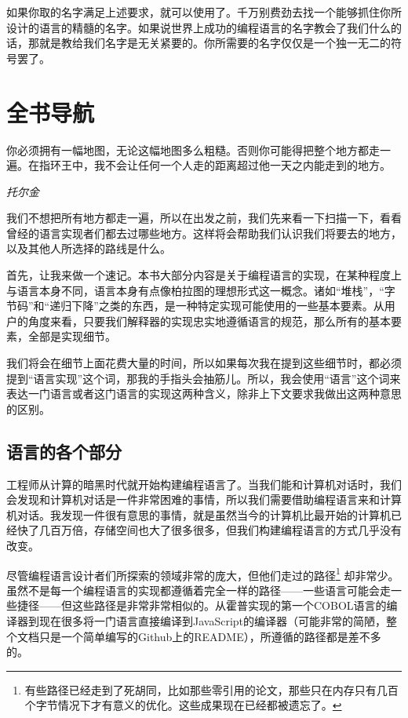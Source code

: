 \documentclass[cn,10pt,math=newtx,citestyle=gb7714-2015,bibstyle=gb7714-2015]{elegantbook}
\begin{document}
如果你取的名字满足上述要求，就可以使用了。千万别费劲去找一个能够抓住你所设计的语言的精髓的名字。如果说世界上成功的编程语言的名字教会了我们什么的话，那就是教给我们名字是无关紧要的。你所需要的名字仅仅是一个独一无二的符号罢了。

\chapter{全书导航}

\epigraph{你必须拥有一幅地图，无论这幅地图多么粗糙。否则你可能得把整个地方都走一遍。在指环王中，我不会让任何一个人走的距离超过他一天之内能走到的地方。}{\textit{托尔金}}

我们不想把所有地方都走一遍，所以在出发之前，我们先来看一下扫描一下，看看曾经的语言实现者们都去过哪些地方。这样将会帮助我们认识我们将要去的地方，以及其他人所选择的路线是什么。

首先，让我来做一个速记。本书大部分内容是关于编程语言的实现，在某种程度上与语言本身不同，语言本身有点像柏拉图的理想形式这一概念。诸如“堆栈”，“字节码”和“递归下降”之类的东西，是一种特定实现可能使用的一些基本要素。从用户的角度来看，只要我们解释器的实现忠实地遵循语言的规范，那么所有的基本要素，全部是实现细节。

我们将会在细节上面花费大量的时间，所以如果每次我在提到这些细节时，都必须提到“语言实现”这个词，那我的手指头会抽筋儿。所以，我会使用“语言”这个词来表达一门语言或者这门语言的实现这两种含义，除非上下文要求我做出这两种意思的区别。

\section{语言的各个部分}

工程师从计算的暗黑时代就开始构建编程语言了。当我们能和计算机对话时，我们会发现和计算机对话是一件非常困难的事情，所以我们需要借助编程语言来和计算机对话。我发现一件很有意思的事情，就是虽然当今的计算机比最开始的计算机已经快了几百万倍，存储空间也大了很多很多，但我们构建编程语言的方式几乎没有改变。

尽管编程语言设计者们所探索的领域非常的庞大，但他们走过的路径\footnote{有些路径已经走到了死胡同，比如那些零引用的论文，那些只在内存只有几百个字节情况下才有意义的优化。这些成果现在已经都被遗忘了。} 却非常少。虽然不是每一个编程语言的实现都遵循着完全一样的路径——一些语言可能会走一些捷径——但这些路径是非常非常相似的。从霍普实现的第一个COBOL语言的编译器到现在很多将一门语言直接编译到JavaScript的编译器（可能非常的简陋，整个文档只是一个简单编写的Github上的README），所遵循的路径都是差不多的。
\end{document}
